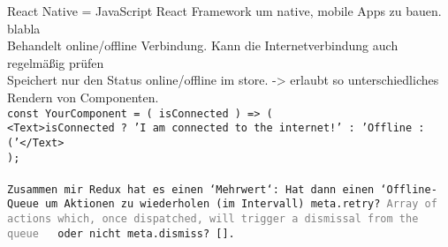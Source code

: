   React Native = JavaScript React Framework um native, mobile Apps zu bauen. blabla\\
  Behandelt online/offline Verbindung. Kann die Internetverbindung auch regelmäßig prüfen\\
  Speichert nur den Status online/offline im store. -> erlaubt so unterschiedliches Rendern von Componenten.\\

\tt{const YourComponent = ({ isConnected }) => (\\
  <Text>{isConnected ? 'I am connected to the internet!' : 'Offline :('}</Text>\\
);\\}\\
Zusammen mir Redux hat es einen `Mehrwert`:
Hat dann einen `Offline-\gls{Queue} um Aktionen zu wiederholen (im Intervall) \tt{meta.retry? \textcolor{gray}  {Array of actions which, once dispatched, will trigger a dismissal from the queue}} ~ oder nicht \tt{meta.dismiss? []}.\cite{rn-offline-gh}
